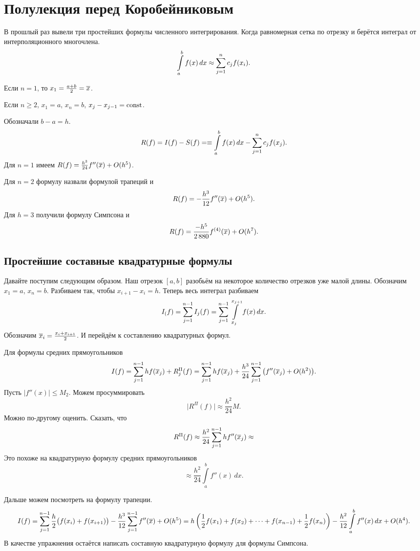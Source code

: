 \section{Полулекция перед Коробейниковым}

В прошлый раз вывели три простейших формулы численного интегрирования. Когда равномерная сетка по отрезку и берётся интеграл от интерполяционного многочлена. 
\[
  \int\limits_a^b f(x)\,dx\approx \sum\limits_{j = 1}^{n} c_j f(x_i).
\]

Если $n=1$, то $x_1 = \frac{a+b}2 = \overline{x}$.

Если $n\ge2$, $x_1=a$, $x_n=b$, $x_j- x_{j-1} = \operatorname{const}$.

Обозначали $b-a=h$.
\[
  R(f) = I(f) - S(f) = \equiv \int\limits_a^b f(x)\,dx - \sum\limits_{j = 1}^{n} c_j f(x_j).
\]
Для $n=1$ имеем $R(f) = \frac{h^3}{24} f''(\overline{x}) + O(h^5)$.

Для $n=2$ формулу назвали формулой трапеций и
\[
  R(f) = -\frac{h^3}{12} f''(\overline{x}) + O(h^5).
\]
Для $h=3$  получили формулу Симпсона и
\[
  R(f) = \frac{-h^5}{2\,880} f^{(4)}(\overline{x}) + O(h^7).
\]

\subsection{Простейшие составные квадратурные формулы}
Давайте поступим следующим образом. Наш отрезок $[a,b]$ разобьём на некоторое количество отрезков уже малой длины. Обозначим $x_1=a$, $x_n=b$. Разбиваем так, чтобы $x_{i+1}-x_i = h$. Теперь весь интеграл разбиваем
\[
  I_(f) = \sum\limits_{j = 1}^{n-1}I_j(f) = \sum\limits_{j = 1}^{n-1}\int\limits_{x_j}^{x_{j+1}} f(x)\,dx.
\]
Обозначим $\overline{x}_i = \frac{x_i + x_{i+1}}2$. И перейдём к составлению квадратурных формул.

Для формулы средних прямоугольников
\[
  I(f) = \sum\limits_{j = 1}^{n-1} hf(\overline{x}_j) + R^\Pi_j(f) = \sum\limits_{j = 1}^{n-1} hf(\overline{x}_j) + \frac{h^3}{24}\sum\limits_{j = 1}^{n-1}\big(f''(\overline{x}_j) + O(h^2)\big).
\]
Пусть $\big|f''(x)\big|\le M_2$. Можем просуммировать
\[
  \big|R^\Pi(f)\big| \approx \frac{h^2}{24} M.
\]
Можно по-другому оценить. Сказать, что
\[
  R^\Pi(f)\approx \frac{h^2}{24} \sum\limits_{j = 1}^{n-1} hf''(\overline{x}_j)\approx
\]
Это похоже на квадратурную формулу средних прямоугольников
\[
  \approx \frac{h^2}{24}\int\limits_a^b f''(x)\,dx.
\]

Дальше можем посмотреть на формулу трапеции.
\[
  I(f) = \sum\limits_{j = 1}^{n-1}\frac h2\big(f(x_i) + f(x_{i+1})\big) - \frac{h^3}{12} \sum\limits_{j = 1}^{n-1} f''(\overline{x}) + O(h^5) =
  h\left( \frac12 f(x_1) + f(x_2) + \dots +f(x_{n-1}) + \frac12f(x_n) \right) - \frac{h^2}{12} \int\limits_a^b f''(x)\,dx + O(h^4).
\]
В качестве упражнения остаётся написать составную квадратурную формулу для формулы Симпсона.


